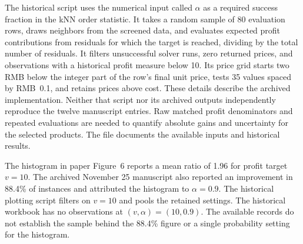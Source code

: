 The historical script uses the numerical input called \(\alpha\) as a required success fraction in the kNN order statistic. It takes a random sample of 80 evaluation rows, draws neighbors from the screened data, and evaluates expected profit contributions from residuals for which the target is reached, dividing by the total number of residuals. It filters unsuccessful solver runs, zero returned prices, and observations with a historical profit measure below 10. Its price grid starts two RMB below the integer part of the row's final unit price, tests 35 values spaced by RMB~0.1, and retains prices above cost. These details describe the archived implementation. Neither that script nor its archived outputs independently reproduce the twelve manuscript entries. Raw matched profit denominators and repeated evaluations are needed to quantify absolute gains and uncertainty for the selected products. The file  documents the available inputs and historical results.


The histogram in paper Figure~6 reports a mean ratio of 1.96 for profit target \(v=10\). The archived November 25 manuscript also reported an improvement in 88.4\% of instances and attributed the histogram to \(\alpha=0.9\). The historical plotting script filters on \(v=10\) and pools the retained settings. The historical workbook has no observations at \((v,\alpha)=(10,0.9)\). The available records do not establish the sample behind the 88.4\% figure or a single probability setting for the histogram.
